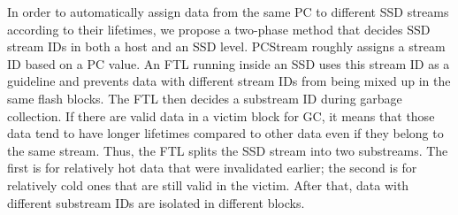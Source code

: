 In order to automatically assign data from the same PC to different SSD streams
according to their lifetimes, we propose a two-phase method that decides SSD
stream IDs in both a host and an SSD level.  {\sf PCStream} roughly assigns a
stream ID based on a PC value.  An FTL running inside an SSD uses this stream
ID as a guideline and prevents data with different stream IDs from being mixed
up in the same flash blocks. The FTL then decides a substream ID during garbage
collection. If there are valid data in a victim block for GC, it means
that those data tend to have longer lifetimes compared to other data even if
they belong to the same stream. Thus, the FTL splits the SSD stream into two
substreams.  The first is for relatively hot data that were invalidated
earlier; the second is for relatively cold ones that are still valid in the
victim.  After that, data with different substream IDs are isolated in
different blocks. 

